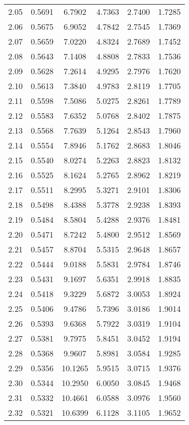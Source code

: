 \documentclass{article}
\begin{document}
\begin{longtable}{cccccc}
2.05 & 0.5691 & 6.7902 & 4.7363 & 2.7400 & 1.7285 \\
2.06 & 0.5675 & 6.9052 & 4.7842 & 2.7545 & 1.7369 \\
2.07 & 0.5659 & 7.0220 & 4.8324 & 2.7689 & 1.7452 \\
2.08 & 0.5643 & 7.1408 & 4.8808 & 2.7833 & 1.7536 \\
2.09 & 0.5628 & 7.2614 & 4.9295 & 2.7976 & 1.7620 \\
2.10 & 0.5613 & 7.3840 & 4.9783 & 2.8119 & 1.7705 \\
2.11 & 0.5598 & 7.5086 & 5.0275 & 2.8261 & 1.7789 \\
2.12 & 0.5583 & 7.6352 & 5.0768 & 2.8402 & 1.7875 \\
2.13 & 0.5568 & 7.7639 & 5.1264 & 2.8543 & 1.7960 \\
2.14 & 0.5554 & 7.8946 & 5.1762 & 2.8683 & 1.8046 \\
2.15 & 0.5540 & 8.0274 & 5.2263 & 2.8823 & 1.8132 \\
2.16 & 0.5525 & 8.1624 & 5.2765 & 2.8962 & 1.8219 \\
2.17 & 0.5511 & 8.2995 & 5.3271 & 2.9101 & 1.8306 \\
2.18 & 0.5498 & 8.4388 & 5.3778 & 2.9238 & 1.8393 \\
2.19 & 0.5484 & 8.5804 & 5.4288 & 2.9376 & 1.8481 \\
2.20 & 0.5471 & 8.7242 & 5.4800 & 2.9512 & 1.8569 \\
2.21 & 0.5457 & 8.8704 & 5.5315 & 2.9648 & 1.8657 \\
2.22 & 0.5444 & 9.0188 & 5.5831 & 2.9784 & 1.8746 \\
2.23 & 0.5431 & 9.1697 & 5.6351 & 2.9918 & 1.8835 \\
2.24 & 0.5418 & 9.3229 & 5.6872 & 3.0053 & 1.8924 \\
2.25 & 0.5406 & 9.4786 & 5.7396 & 3.0186 & 1.9014 \\
2.26 & 0.5393 & 9.6368 & 5.7922 & 3.0319 & 1.9104 \\
2.27 & 0.5381 & 9.7975 & 5.8451 & 3.0452 & 1.9194 \\
2.28 & 0.5368 & 9.9607 & 5.8981 & 3.0584 & 1.9285 \\
2.29 & 0.5356 & 10.1265 & 5.9515 & 3.0715 & 1.9376 \\
2.30 & 0.5344 & 10.2950 & 6.0050 & 3.0845 & 1.9468 \\
2.31 & 0.5332 & 10.4661 & 6.0588 & 3.0976 & 1.9560 \\
2.32 & 0.5321 & 10.6399 & 6.1128 & 3.1105 & 1.9652 \\

\end{longtable}
\end{document}
